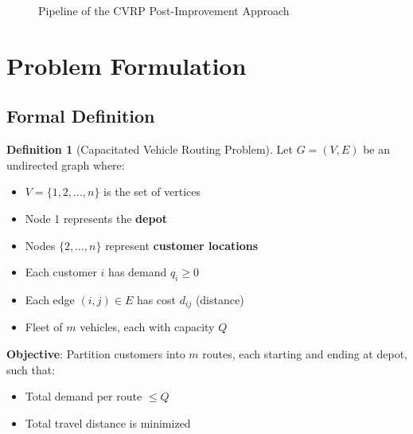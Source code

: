 \documentclass[12pt,a4paper]{article}
\theoremstyle{definition}
\newtheorem{definition}{Definition}[section]
\begin{document}
\begin{figure}[H]
\centering
{}
\caption{Pipeline of the CVRP Post-Improvement Approach}
\end{figure}

\section{Problem Formulation}

\subsection{Formal Definition}

\begin{definition}[Capacitated Vehicle Routing Problem]
Let $G = (V, E)$ be an undirected graph where:
\begin{itemize}
    \item $V = \{1, 2, \ldots, n\}$ is the set of vertices
    \item Node 1 represents the \textbf{depot}
    \item Nodes $\{2, \ldots, n\}$ represent \textbf{customer locations}
    \item Each customer $i$ has demand $q_i \geq 0$
    \item Each edge $(i,j) \in E$ has cost $d_{ij}$ (distance)
    \item Fleet of $m$ vehicles, each with capacity $Q$
\end{itemize}

\textbf{Objective}: Partition customers into $m$ routes, each starting and ending at depot, such that:
\begin{itemize}
    \item Total demand per route $\leq Q$
    \item Total travel distance is minimized
\end{itemize}
\end{definition}
\end{document}
